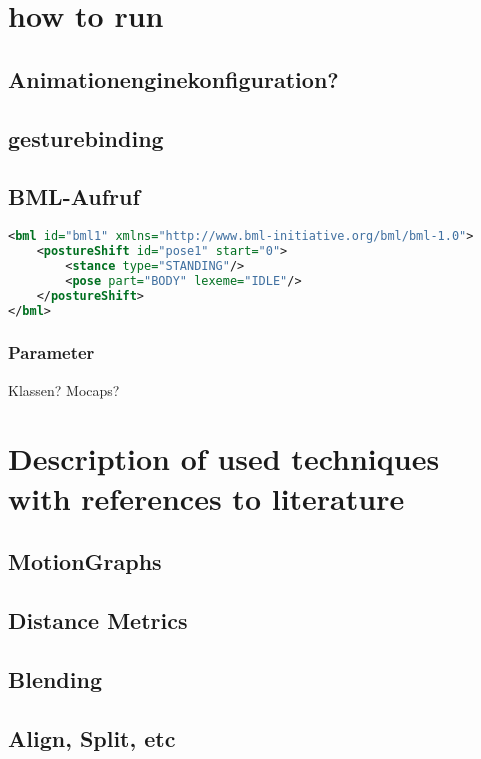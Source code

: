 \documentclass[a4paper,10pt]{scrartcl}
\let\stdsubsection\subsection
\renewcommand\subsection{\nopagebreak\stdsubsection}
\begin{document}
\tableofcontents

\section{how to run}

\subsection{Animationenginekonfiguration?}

\subsection{gesturebinding}

\subsection{BML-Aufruf}

\begin{lstlisting}[language=XML]
<bml id="bml1" xmlns="http://www.bml-initiative.org/bml/bml-1.0">
    <postureShift id="pose1" start="0">
        <stance type="STANDING"/>
        <pose part="BODY" lexeme="IDLE"/>
    </postureShift>
</bml>
 \end{lstlisting}

\subsubsection{Parameter}
Klassen? Mocaps?


\section{Description of used techniques with references to literature}

\subsection{MotionGraphs}
\subsection{Distance Metrics}
\subsection{Blending}
\subsection{Align, Split, etc}
\end{document}
